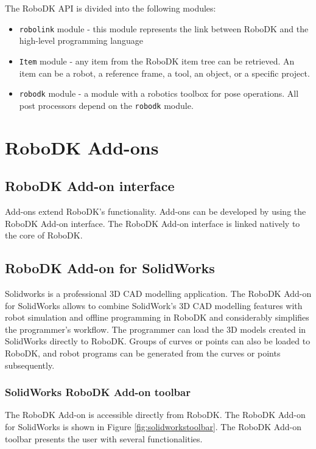 The RoboDK API is divided into the following modules:


\begin{itemize}
    \item \texttt{robolink} module - this module represents the link between RoboDK and the high-level programming language
    \item \texttt{Item} module - any item from the RoboDK item tree can be retrieved.  An item can be a robot, a reference frame, a tool, an object, or a specific project.
    \item \texttt{robodk} module - a module with a robotics toolbox for pose operations. All post processors depend on the \texttt{robodk} module.
\end{itemize}

\section{RoboDK Add-ons}

\subsection{RoboDK Add-on interface}

Add-ons extend RoboDK's functionality. Add-ons can be developed by using the RoboDK Add-on interface. The RoboDK Add-on interface is linked natively to the core of RoboDK.

\subsection{RoboDK Add-on for SolidWorks}

Solidworks is a professional 3D CAD modelling application. The RoboDK Add-on for SolidWorks allows to combine SolidWork's 3D CAD modelling features with robot simulation and offline programming in RoboDK and considerably simplifies the programmer's workflow. The programmer can load the 3D models created in SolidWorks directly to RoboDK. Groups of curves or points can also be loaded to RoboDK, and robot programs can be generated from the curves or points subsequently.

\subsubsection*{SolidWorks RoboDK Add-on toolbar}

The RoboDK Add-on is accessible directly from RoboDK.  The RoboDK Add-on for SolidWorks is shown in Figure  \ref{fig:solidworkstoolbar}. The RoboDK Add-on toolbar presents the user with several functionalities.

